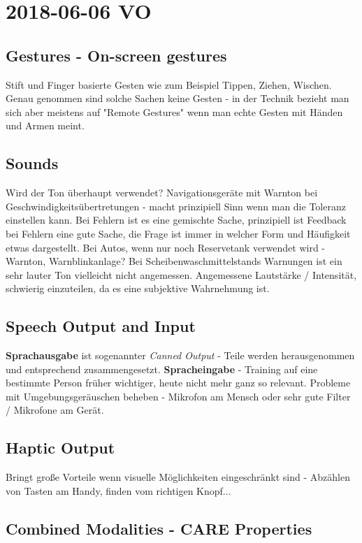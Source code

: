 \section{2018-06-06 VO}

\subsection{Gestures - On-screen gestures}

Stift und Finger basierte Gesten wie zum Beispiel Tippen, Ziehen, Wischen. 
Genau genommen sind solche Sachen keine Gesten - in der Technik bezieht man sich 
aber meistens auf "Remote Gestures" wenn man echte Gesten mit Händen und Armen meint.
\subsection{Sounds}
Wird der Ton überhaupt verwendet? Navigationsgeräte mit Warnton bei Geschwindigkeitsübertretungen - macht prinzipiell Sinn wenn man die Toleranz einstellen kann.
Bei Fehlern ist es eine gemischte Sache, prinzipiell ist Feedback bei Fehlern eine gute Sache, die Frage ist immer in welcher Form und Häufigkeit etwas dargestellt. 
Bei Autos, wenn nur noch Reservetank verwendet wird - Warnton, Warnblinkanlage?
Bei Scheibenwaschmittelstands Warnungen ist ein sehr lauter Ton vielleicht nicht angemessen.
Angemessene Lautstärke / Intensität, schwierig einzuteilen, da es eine subjektive Wahrnehmung ist.
\subsection{Speech Output and Input}
\textbf{Sprachausgabe} ist sogenannter \textit{Canned Output} - Teile werden herausgenommen
und entsprechend zusammengesetzt. 
\textbf{Spracheingabe} - Training auf eine bestimmte Person früher wichtiger, heute nicht mehr
ganz so relevant. Probleme mit Umgebungsgeräuschen beheben - Mikrofon am Mensch oder 
sehr gute Filter / Mikrofone am Gerät.

\subsection{Haptic Output}

Bringt große Vorteile wenn visuelle Möglichkeiten eingeschränkt sind - Abzählen von 
Tasten am Handy, finden vom richtigen Knopf...

\subsection{Combined Modalities - CARE Properties}

